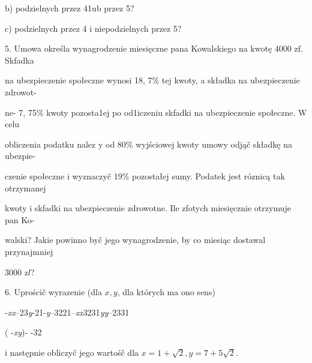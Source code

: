 \documentclass[a4paper,12pt]{article}
\begin{document}
b) podzielnych przez 41ub przez 5?

c) podzielnych przez 4 $\mathrm{i}$ niepodzielnych przez 5?

5. Umowa określa wynagrodzenie miesięczne pana Kowalskiego na kwotę 4000 $\mathrm{z}\mathrm{f}$. Skfadka

na ubezpieczenie społeczne wynosi 18, 7\% tej kwoty, a składka na ubezpieczenie zdrowot-

ne- 7, 75\% kwoty pozosta1ej po od1iczeniu skfadki na ubezpieczenie społeczne. $\mathrm{W}$ celu

obliczenia podatku nalez $\mathrm{y}$ od 80\% wyjściowej kwoty umowy odjąč składkę na ubezpie-

czenie społeczne $\mathrm{i}$ wyznaczyč 19\% pozostałej sumy. Podatek jest róznicą tak otrzymanej

kwoty $\mathrm{i}$ skfadki na ubezpieczenie zdrowotne. Ile zfotych miesięcznie otrzymuje pan Ko-

walski? Jakie powinno byč jego wynagrodzenie, by co miesiąc dostawal przynajmniej

3000 $\mathrm{z}l$?

6. Uprościč wyrazenie (dla $x, y$, dla których ma ono sens)

-{\it xx}--23{\it y}-21-{\it y}--3221--{\it xx}3231{\it yy}--2331

( -{\it xy})- -32

$\mathrm{i}$ następnie obliczyč jego wartośč dla $x=1+\sqrt{2}, y=7+5\sqrt{2}.$
\end{document}
